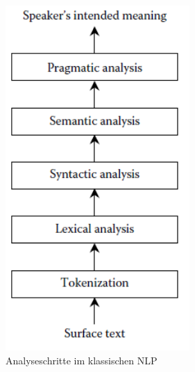 \begin{figure}
\includegraphics[width=7cm]{pictures/Analyseschritte.png}
\caption{Analyseschritte im klassischen NLP}
\label{fig:STEPS}
\end{figure}



